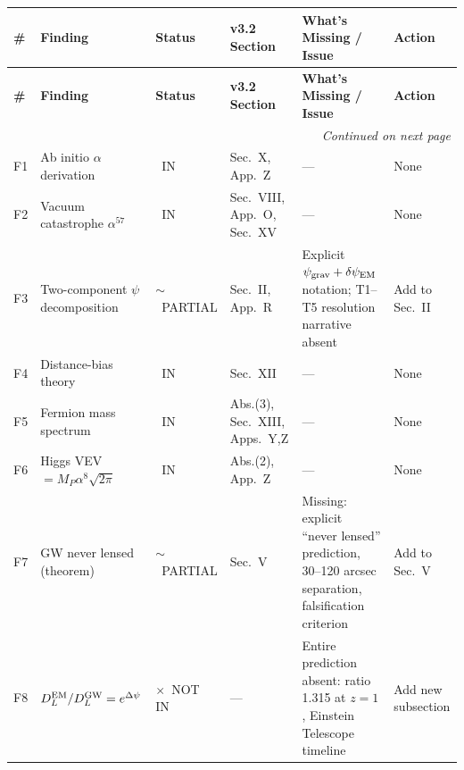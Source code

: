 \documentclass[11pt,a4paper]{article}
\newcommand{\vin}{\textcolor{statusIN}{\checkmark~IN}}
\newcommand{\vpartial}{\textcolor{statusPARTIAL}{$\sim$~PARTIAL}}
\newcommand{\vnot}{\textcolor{statusNOT}{$\times$~NOT IN}}
\begin{document}
{\small
\begin{longtable}{|p{0.5cm}|p{4.8cm}|p{1.6cm}|p{2.5cm}|p{4.5cm}|p{1.8cm}|}
\hline
\rowcolor{gray!20}
\textbf{\#} & \textbf{Finding} & \textbf{Status} & \textbf{v3.2 Section} & \textbf{What's Missing / Issue} & \textbf{Action} \\
\hline
\endfirsthead
\hline
\rowcolor{gray!20}
\textbf{\#} & \textbf{Finding} & \textbf{Status} & \textbf{v3.2 Section} & \textbf{What's Missing / Issue} & \textbf{Action} \\
\hline
\endhead

\hline
\multicolumn{6}{r}{\emph{Continued on next page}} \\
\endfoot

\hline
\endlastfoot

\rowcolor{paradigm!8}
F1 & Ab initio $\alpha$ derivation & \vin & Sec.~X, App.~Z & --- & None \\
\hline
\rowcolor{paradigm!8}
F2 & Vacuum catastrophe $\alpha^{57}$ & \vin & Sec.~VIII, App.~O, Sec.~XV & --- & None \\
\hline
\rowcolor{paradigm!8}
F3 & Two-component $\psi$ decomposition & \vpartial & Sec.~II, App.~R & Explicit $\psi_{\rm grav} + \delta\psi_{\rm EM}$ notation; T1--T5 resolution narrative absent & Add to Sec.~II \\
\hline
\rowcolor{paradigm!8}
F4 & Distance-bias theory & \vin & Sec.~XII & --- & None \\
\hline
\rowcolor{paradigm!8}
F5 & Fermion mass spectrum & \vin & Abs.(3), Sec.~XIII, Apps.~Y,Z & --- & None \\
\hline
\rowcolor{paradigm!8}
F6 & Higgs VEV $= M_P\alpha^8\sqrt{2\pi}$ & \vin & Abs.(2), App.~Z & --- & None \\
\hline
\rowcolor{paradigm!8}
F7 & GW never lensed (theorem) & \vpartial & Sec.~V & Missing: explicit ``never lensed'' prediction, 30--120 arcsec separation, falsification criterion & Add to Sec.~V \\
\hline
\rowcolor{paradigm!8}
F8 & $D_L^{\rm EM}/D_L^{\rm GW} = e^{\Delta\psi}$ & \vnot & --- & Entire prediction absent: ratio 1.315 at $z=1$, Einstein Telescope timeline & Add new subsection \\
\hline


\end{longtable}}
\end{document}
